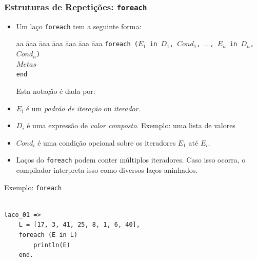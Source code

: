 \begin{frame}[fragile]
\frametitle{Estruturas de Repetições: \texttt{foreach}}

    \begin{itemize}
        \item Um laço \texttt{foreach} tem a seguinte forma:
        
        \begin{tabbing}
            aa \= aaa \= aaa \= aaa \= aaa \= aaa \= aaa \kill
            \> \texttt{foreach ($E_1$ in $D_1$, $Cond_1$, $\ldots$, $E_n$ in $D_n$, $Cond_n$)}  \\
            \> \> $Metas$ \\
            \>  \texttt{end} 
        \end{tabbing}
    
   \pause    
   Esta notação é dada por:
        
    \item  $E_i$ é um \emph{padrão de iteração} ou \emph{iterador}. 
        
    \item  $D_i$ é  uma expressão de \emph{valor composto}. Exemplo: uma lista de valores
        
     \item  $Cond_i$ é uma condição opcional sobre os iteradores $E_1$ até $E_i$.
        
     \item Laços do \texttt{foreach} podem conter múltiplos iteradores. 
     Caso isso ocorra, o compilador interpreta isso como diversos laços aninhados.
        
        
        
    \end{itemize}
\end{frame}    


\begin{frame}[fragile]

\begin{block}{Exemplo: \texttt{foreach} }
     
\begin{lstlisting}[frame=single]
    
laco_01 =>  
    L = [17, 3, 41, 25, 8, 1, 6, 40],  
    foreach (E in L)  
        println(E)  
    end.  
\end{lstlisting}
        
\end{block}
\end{frame}    


